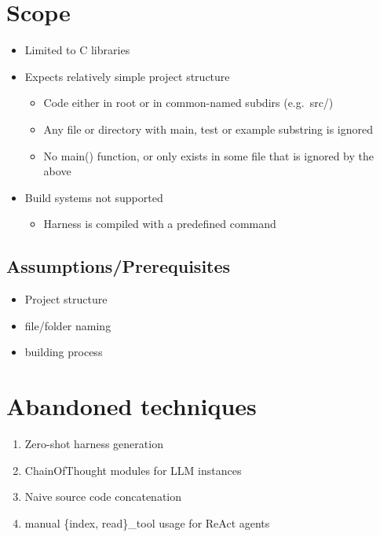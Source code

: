 \documentclass[
  a4paper,
  DIV=11,
  numbers=noendperiod]{scrreprt}
\providecommand{\tightlist}{%
  \setlength{\itemsep}{0pt}\setlength{\parskip}{0pt}}
\theoremstyle{definition}
\theoremstyle{remark}
\begin{document}
\section{Scope}\label{scope}

\begin{itemize}
\tightlist
\item
  Limited to C libraries
\item
  Expects relatively simple project structure

  \begin{itemize}
  \tightlist
  \item
    Code either in root or in common-named subdirs (e.g.~src/)
  \item
    Any file or directory with main, test or example substring is
    ignored
  \item
    No main() function, or only exists in some file that is ignored by
    the above
  \end{itemize}
\item
  Build systems not supported

  \begin{itemize}
  \tightlist
  \item
    Harness is compiled with a predefined command
  \end{itemize}
\end{itemize}

\subsection{Assumptions/Prerequisites}\label{sec-assumptions}

\begin{itemize}
\tightlist
\item
  Project structure
\item
  file/folder naming
\item
  building process
\end{itemize}

\section{Abandoned techniques}\label{abandoned-techniques}

\begin{enumerate}
\def\labelenumi{\arabic{enumi}.}
\item
  Zero-shot harness generation
\item
  ChainOfThought modules for LLM instances \autocite{chainofthought}
\item
  Naive source code concatenation
\item
  manual \{index, read\}\_tool usage for ReAct agents
\end{enumerate}
\end{document}
